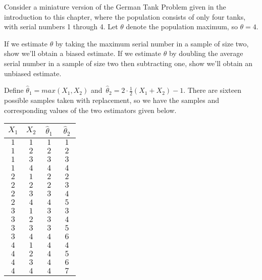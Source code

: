 \begin{examp}\label{MiniGermanTank}Consider a miniature version of the German Tank Problem given in the introduction to this chapter, where the population consists of only four tanks, with serial numbers 1 through 4. Let $\theta$ denote the population maximum, so $\theta = 4$. 
\par
\noindent If we estimate $\theta$ by taking the maximum serial number in a sample of size two, show we'll obtain a biased estimate. If we estimate $\theta$ by doubling the average serial number in a sample of size two then subtracting one, show we'll obtain an unbiased estimate.
\par
\noindent Define $\widehat{\theta}_1 = max(X_1,X_2)$ and \,$\widehat{\theta}_2 = 2 \cdot \frac{1}{2}(X_1 + X_2) - 1$. There are sixteen possible samples taken with replacement, so we have the samples and corresponding values of the two estimators given below. \\
\begin{center}
\begin{minipage}{0.5\textwidth}
\centering
\begin{tabular}{c|c|c|c}
$X_1$ & $X_2$ & $\,\widehat{\theta}_1\,$ & $\,\widehat{\theta}_2\,$ \\
\hline
$1$ & $1$ & $1$ & $1$ \\
$1$ & $2$ & $2$ & $2$ \\
$1$ & $3$ & $3$ & $3$ \\
$1$ & $4$ & $4$ & $4$ \\
$2$ & $1$ & $2$ & $2$ \\
$2$ & $2$ & $2$ & $3$ \\
$2$ & $3$ & $3$ & $4$ \\
$2$ & $4$ & $4$ & $5$ \\
$3$ & $1$ & $3$ & $3$ \\
$3$ & $2$ & $3$ & $4$ \\
$3$ & $3$ & $3$ & $5$ \\
$3$ & $4$ & $4$ & $6$ \\
$4$ & $1$ & $4$ & $4$ \\
$4$ & $2$ & $4$ & $5$ \\
$4$ & $3$ & $4$ & $6$ \\
$4$ & $4$ & $4$ & $7$ \\
\end{tabular}
\end{minipage}\begin{minipage}{0.5\textwidth}
\centering
\renewcommand*{\arraystretch}{1.23}
\begin{tabular}{c|c}

\end{tabular}
\end{minipage}
\end{center}
\end{examp}
